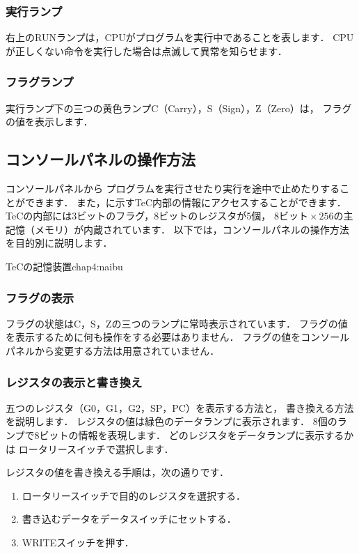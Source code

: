 \subsubsection{実行ランプ}
右上のRUNランプは，CPUがプログラムを実行中であることを表します．
CPUが正しくない命令を実行した場合は点滅して異常を知らせます．

\subsubsection{フラグランプ}
実行ランプ下の三つの黄色ランプC（Carry），S（Sign），Z（Zero）は，
フラグの値を表示します．

\subsection{コンソールパネルの操作方法}
\label{operation}
コンソールパネルから
プログラムを実行させたり実行を途中で止めたりすることができます．
また，に示すTeC内部の情報にアクセスすることができます．
TeCの内部には3ビットのフラグ，8ビットのレジスタが5個，
$8ビット \times 256$の主記憶（メモリ）が内蔵されています．
以下では，コンソールパネルの操作方法を目的別に説明します．

          {TeCの記憶装置}{chap4:naibu}

\subsubsection{フラグの表示}
フラグの状態はC，S，Zの三つのランプに常時表示されています．
フラグの値を表示するために何も操作をする必要はありません．
フラグの値をコンソールパネルから変更する方法は用意されていません．

\subsubsection{レジスタの表示と書き換え}
五つのレジスタ（G0，G1，G2，SP，PC）を表示する方法と，
書き換える方法を説明します．
レジスタの値は緑色のデータランプに表示されます．
8個のランプで8ビットの情報を表現します．
どのレジスタをデータランプに表示するかは
ロータリースイッチで選択します．
\vspace{0.3cm}

レジスタの値を書き換える手順は，次の通りです．
\begin{enumerate}
\item ロータリースイッチで目的のレジスタを選択する．
\item 書き込むデータをデータスイッチにセットする．
\item WRITEスイッチを押す．
\end{enumerate}

